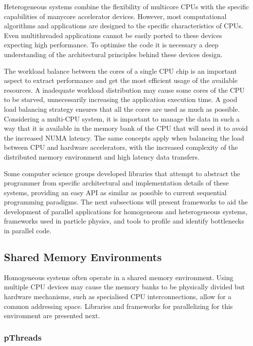 Heterogeneous systems combine the flexibility of multicore CPUs with the specific capabilities of manycore accelerator devices. However, most computational algorithms and applications are designed to the specific characteristics of CPUs. Even multithreaded applications cannot be easily ported to these devices expecting high performance. To optimise the code it is necessary a deep understanding of the architectural principles behind these devices design.

The workload balance between the cores of a single CPU chip is an important aspect to extract performance and get the most efficient usage of the available resources. A inadequate workload distribution may cause some cores of the CPU to be starved, unnecessarily increasing the application execution time. A good load balancing strategy ensures that all the cores are used as much as possible. Considering a multi-CPU system, it is important to manage the data in such a way that it is available in the memory bank of the CPU that will need it to avoid the increased NUMA latency. The same concepts apply when balancing the load between CPU and hardware accelerators, with the increased complexity of the distributed memory environment and high latency data transfers.

Some computer science groups developed libraries that attempt to abstract the programmer from specific architectural and implementation details of these systems, providing an easy API as similar as possible to current sequential programming paradigms. The next subsections will present frameworks to aid the development of parallel applications for homogeneous and heterogeneous systems, frameworks used in particle physics, and tools to profile and identify bottlenecks in parallel code.

\subsection{Shared Memory Environments}
\label{shared_mem}

Homogeneous systems often operate in a shared memory environment. Using multiple CPU devices may cause the memory banks to be physically divided but hardware mechanisms, such as specialised CPU interconnections, allow for a common addressing space. Libraries and frameworks for parallelizing for this environment are presented next.

\subsubsection*{pThreads}

